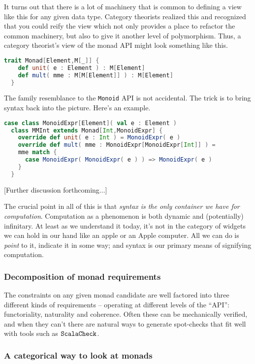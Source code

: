 It turns out that there is a lot of machinery that is common to
defining a view like this for any given data type. Category theorists
realized this and recognized that you could reify the view which not
only provides a place to refactor the common machinery, but also to
give it another level of polymorphism. Thus, a category theorist's
view of the monad API might look something like this.

\begin{lstlisting}[language=Scala]
  trait Monad[Element,M[_]] {
    def unit( e : Element ) : M[Element]
    def mult( mme : M[M[Element]] ) : M[Element] 
  }
\end{lstlisting}

The family resemblance to the \lstinline[language=Scala]!Monoid! API
is not accidental. The trick is to bring syntax back into the picture. Here's an example.

\begin{lstlisting}[language=Scala]
  case class MonoidExpr[Element]( val e : Element )
  class MMInt extends Monad[Int,MonoidExpr] {
    override def unit( e : Int ) = MonoidExpr( e )
    override def mult( mme : MonoidExpr[MonoidExpr[Int]] ) =
    mme match {
      case MonoidExpr( MonoidExpr( e ) ) => MonoidExpr( e )
    }
  }
\end{lstlisting}

[Further discussion forthcoming...]

The crucial point in all of this is that \emph{syntax is the only
  container we have for computation}. Computation as a phenomenon is
both dynamic and (potentially) infinitary. At least as we understand
it today, it's not in the category of widgets we can hold in our hand
like an apple or an Apple computer. All we can do is \emph{point}
to it, indicate it in some way; and syntax is our primary means of
signifying computation.

\subsubsection{Decomposition of monad requirements}

The constraints on any given monad candidate are well factored into
three different kinds of requirements -- operating at different levels
of the ``API'': functoriality, naturality and coherence. Often these
can be mechanically verified, and when they can't there are natural
ways to generate spot-checks that fit well with tools such as
$\texttt{ScalaCheck}$.

\subsubsection{A categorical way to look at monads}

